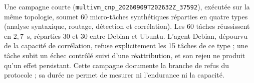 
Une campagne courte (\texttt{multivm\_cnp\_20260909T202632Z\_37592}), exécutée sur la même topologie, soumet 60 micro-tâches synthétiques réparties en quatre types (analyse syntaxique, routage, détection et corrélation). Les 60 tâches réussissent en $2{,}7$~s, réparties 30 et 30 entre Debian et Ubuntu. L'agent Debian, dépourvu de la capacité de corrélation, refuse explicitement les 15 tâches de ce type ; une tâche subit un échec contrôlé suivi d'une réattribution, et son rejeu ne produit qu'un effet persistant. Cette campagne documente la branche de refus du protocole ; sa durée ne permet de mesurer ni l'endurance ni la capacité.
